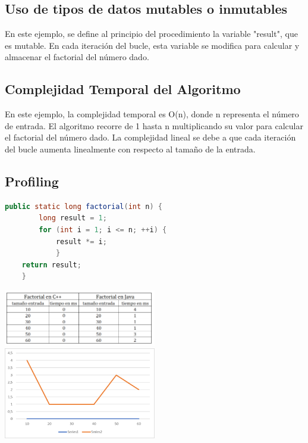\documentclass{article}
\begin{document}
\subsection{Uso de tipos de datos mutables o inmutables}
En este ejemplo, se define al principio del procedimiento la variable "result", que es mutable. En cada iteración del bucle, esta variable se modifica para calcular y almacenar el factorial del número dado.


\subsection{Complejidad Temporal del Algoritmo}
En este ejemplo, la complejidad temporal es O(n), donde n representa el número de entrada. El algoritmo recorre de 1 hasta n multiplicando su valor para calcular el factorial del número dado. La complejidad lineal se debe a que cada iteración del bucle aumenta linealmente con respecto al tamaño de la entrada.


\subsection{Profiling}

\begin{lstlisting}[language=Java, caption=Ejemplo de código en Java]
    public static long factorial(int n) {
        long result = 1;
        for (int i = 1; i <= n; ++i) {
            result *= i;
            }
    return result;
    }
\end{lstlisting}

\includegraphics[width=0.5\textwidth]{c++vsjavaTabla.png}
\includegraphics[width=0.5\textwidth]{c++vsjavaGrafica.png}
\end{document}
